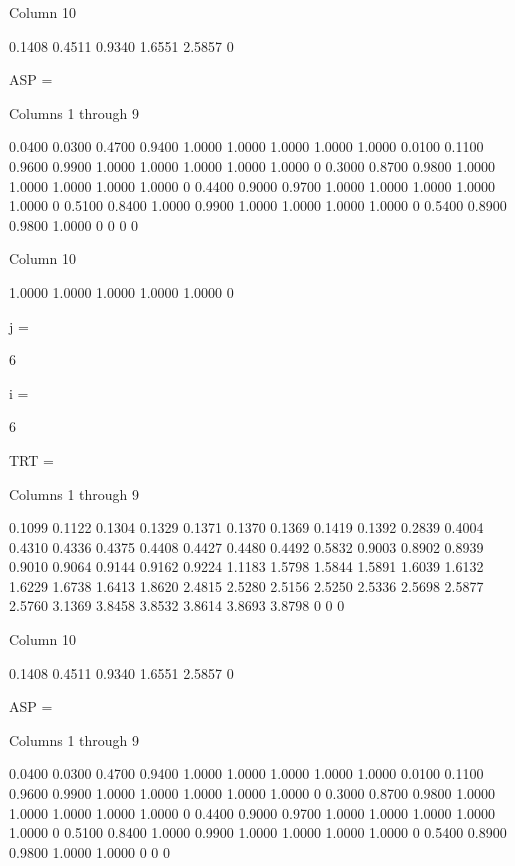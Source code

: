   Column 10

    0.1408
    0.4511
    0.9340
    1.6551
    2.5857
         0


ASP =

  Columns 1 through 9

    0.0400    0.0300    0.4700    0.9400    1.0000    1.0000    1.0000    1.0000    1.0000
    0.0100    0.1100    0.9600    0.9900    1.0000    1.0000    1.0000    1.0000    1.0000
         0    0.3000    0.8700    0.9800    1.0000    1.0000    1.0000    1.0000    1.0000
         0    0.4400    0.9000    0.9700    1.0000    1.0000    1.0000    1.0000    1.0000
         0    0.5100    0.8400    1.0000    0.9900    1.0000    1.0000    1.0000    1.0000
         0    0.5400    0.8900    0.9800    1.0000         0         0         0         0

  Column 10

    1.0000
    1.0000
    1.0000
    1.0000
    1.0000
         0


j =

     6


i =

     6


TRT =

  Columns 1 through 9

    0.1099    0.1122    0.1304    0.1329    0.1371    0.1370    0.1369    0.1419    0.1392
    0.2839    0.4004    0.4310    0.4336    0.4375    0.4408    0.4427    0.4480    0.4492
    0.5832    0.9003    0.8902    0.8939    0.9010    0.9064    0.9144    0.9162    0.9224
    1.1183    1.5798    1.5844    1.5891    1.6039    1.6132    1.6229    1.6738    1.6413
    1.8620    2.4815    2.5280    2.5156    2.5250    2.5336    2.5698    2.5877    2.5760
    3.1369    3.8458    3.8532    3.8614    3.8693    3.8798         0         0         0

  Column 10

    0.1408
    0.4511
    0.9340
    1.6551
    2.5857
         0


ASP =

  Columns 1 through 9

    0.0400    0.0300    0.4700    0.9400    1.0000    1.0000    1.0000    1.0000    1.0000
    0.0100    0.1100    0.9600    0.9900    1.0000    1.0000    1.0000    1.0000    1.0000
         0    0.3000    0.8700    0.9800    1.0000    1.0000    1.0000    1.0000    1.0000
         0    0.4400    0.9000    0.9700    1.0000    1.0000    1.0000    1.0000    1.0000
         0    0.5100    0.8400    1.0000    0.9900    1.0000    1.0000    1.0000    1.0000
         0    0.5400    0.8900    0.9800    1.0000    1.0000         0         0         0

